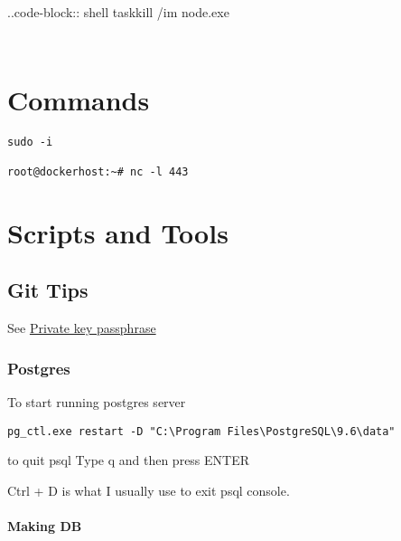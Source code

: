 ..code-block:: shell taskkill /im node.exe

\begin{verbatim}
\end{verbatim}

\begin{verbatim}
\end{verbatim}


\section{Commands}\label{commands}

\begin{Shaded}
\end{Shaded}

\begin{verbatim}
sudo -i

root@dockerhost:~# nc -l 443
\end{verbatim}


\section{Scripts and Tools}\label{scripts-and-tools}


\subsection{Git Tips}\label{git-tips}

See
\href{https://serverfault.com/questions/50775/how-do-i-change-my-private-key-passphrase}{Private key passphrase}


\subsubsection{Postgres}\label{postgres}

To start running postgres server

\begin{verbatim}
pg_ctl.exe restart -D "C:\Program Files\PostgreSQL\9.6\data"
\end{verbatim}

to quit psql Type q and then press ENTER

Ctrl + D is what I usually use to exit psql console.


\paragraph{Making DB}\label{making-db}

